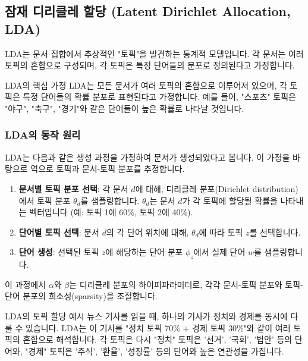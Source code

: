 \documentclass[11pt,a4paper]{article}
\begin{document}
\newpage
\subsection{잠재 디리클레 할당 (Latent Dirichlet Allocation, LDA)}
LDA는 문서 집합에서 추상적인 "토픽"을 발견하는 통계적 모델입니다. 각 문서는 여러 토픽의 혼합으로 구성되며, 각 토픽은 특정 단어들의 분포로 정의된다고 가정합니다.

\begin{definitionbox}{LDA의 핵심 가정}
LDA는 모든 문서가 여러 토픽의 혼합으로 이루어져 있으며, 각 토픽은 특정 단어들의 확률 분포로 표현된다고 가정합니다. 예를 들어, "스포츠" 토픽은 "야구", "축구", "경기"와 같은 단어들이 높은 확률로 나타날 것입니다.
\end{definitionbox}

\subsubsection{LDA의 동작 원리}
LDA는 다음과 같은 생성 과정을 가정하여 문서가 생성되었다고 봅니다. 이 가정을 바탕으로 역으로 토픽과 문서-토픽 분포를 추정합니다.

\begin{enumerate}
    \item \textbf{문서별 토픽 분포 선택}: 각 문서 $d$에 대해, 디리클레 분포(Dirichlet distribution)에서 토픽 분포 $\theta_d$를 샘플링합니다. $\theta_d$는 문서 $d$가 각 토픽에 할당될 확률을 나타내는 벡터입니다 (예: 토픽 1에 60\%, 토픽 2에 40\%).
    \item \textbf{단어별 토픽 선택}: 문서 $d$의 각 단어 위치에 대해, $\theta_d$에 따라 토픽 $z$를 선택합니다.
    \item \textbf{단어 생성}: 선택된 토픽 $z$에 해당하는 단어 분포 $\phi_z$에서 실제 단어 $w$를 샘플링합니다.
\end{enumerate}
이 과정에서 $\alpha$와 $\beta$는 디리클레 분포의 하이퍼파라미터로, 각각 문서-토픽 분포와 토픽-단어 분포의 희소성(sparsity)을 조절합니다.

\begin{examplebox}{LDA의 토픽 할당 예시}
뉴스 기사를 읽을 때, 하나의 기사가 정치와 경제를 동시에 다룰 수 있습니다. LDA는 이 기사를 "정치 토픽 70\% + 경제 토픽 30\%"와 같이 여러 토픽의 혼합으로 해석합니다. 각 토픽은 다시 "정치" 토픽은 '선거', '국회', '법안' 등의 단어와, "경제" 토픽은 '주식', '환율', '성장률' 등의 단어와 높은 연관성을 가집니다.
\end{examplebox}
\end{document}

